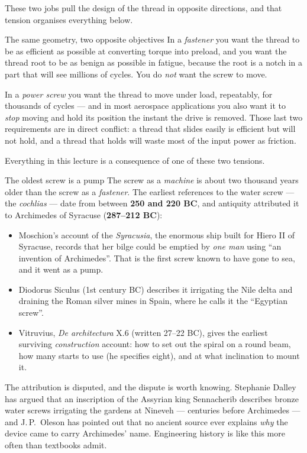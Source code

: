 \documentclass[11pt,a4paper]{article}
\begin{document}
These two jobs pull the design of the thread in opposite directions, and that tension organises
everything below.

\begin{keybox}{The same geometry, two opposite objectives}
In a \emph{fastener} you want the thread to be as efficient as possible at converting torque into
preload, and you want the thread root to be as benign as possible in fatigue, because the root is a
notch in a part that will see millions of cycles. You do \emph{not} want the screw to move.

In a \emph{power screw} you want the thread to move under load, repeatably, for thousands of cycles ---
and in most aerospace applications you also want it to \emph{stop} moving and hold its position the
instant the drive is removed. Those last two requirements are in direct conflict: a thread that slides
easily is efficient but will not hold, and a thread that holds will waste most of the input power as
friction.

Everything in this lecture is a consequence of one of these two tensions.
\end{keybox}

\begin{aerobox}{The oldest screw is a pump}
The screw as a \emph{machine} is about two thousand years older than the screw as a \emph{fastener}.
The earliest references to the water screw --- the \emph{cochlias} --- date from between
\textbf{250 and 220 BC}, and antiquity attributed it to Archimedes of Syracuse
(\textbf{287--212 BC}):

\begin{itemize}[leftmargin=*,itemsep=1pt]
\item Moschion's account of the \emph{Syracusia}, the enormous ship built for Hiero II of Syracuse,
  records that her bilge could be emptied by \emph{one man} using ``an invention of Archimedes''.
  That is the first screw known to have gone to sea, and it went as a pump.
\item Diodorus Siculus (1st century BC) describes it irrigating the Nile delta and draining the
  Roman silver mines in Spain, where he calls it the ``Egyptian screw''.
\item Vitruvius, \emph{De architectura} X.6 (written 27--22 BC), gives the earliest surviving
  \emph{construction} account: how to set out the spiral on a round beam, how many starts to use
  (he specifies eight), and at what inclination to mount it.
\end{itemize}

\medskip
The attribution is disputed, and the dispute is worth knowing. Stephanie Dalley has argued that an
inscription of the Assyrian king Sennacherib describes bronze water screws irrigating the gardens at
Nineveh --- centuries before Archimedes --- and J.\,P.\ Oleson has pointed out that no ancient
source ever explains \emph{why} the device came to carry Archimedes' name. Engineering history is
like this more often than textbooks admit.
\end{aerobox}
\end{document}
